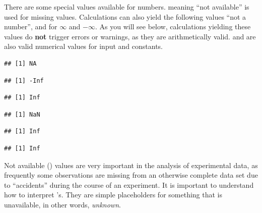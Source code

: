 \documentclass[krantz2]{krantz}\usepackage{knitr}
\begin{document}
There\label{par:special:values} are some special values available for numbers.  meaning ``not available'' is used for missing values. Calculations can also yield the following values  ``not a number'',  and  for $\infty$ and $-\infty$. As you will see below, calculations yielding these values do \textbf{not} trigger errors or warnings, as they are arithmetically valid.  and  are also valid numerical values for input and constants.

\begin{knitrout}\footnotesize
{}\color{fgcolor}\begin{kframe}
\begin{alltt}
 \hlkwb{<-} 
\end{alltt}
\begin{verbatim}
## [1] NA
\end{verbatim}
\begin{alltt}
\hlopt{-} \hlopt{/} 
\end{alltt}
\begin{verbatim}
## [1] -Inf
\end{verbatim}
\begin{alltt}
 \hlopt{/} 
\end{alltt}
\begin{verbatim}
## [1] Inf
\end{verbatim}
\begin{alltt}
 \hlopt{/} 
\end{alltt}
\begin{verbatim}
## [1] NaN
\end{verbatim}
\begin{alltt}
 \hlopt{+} 
\end{alltt}
\begin{verbatim}
## [1] Inf
\end{verbatim}
\begin{alltt}
 \hlkwb{<-} \hlopt{-}
 \hlopt{* -}
\end{alltt}
\begin{verbatim}
## [1] Inf
\end{verbatim}
\end{kframe}
\end{knitrout}

Not available () values are very important in the analysis of experimental data, as frequently some observations are missing from an otherwise complete data set due to ``accidents'' during the course of an experiment. It is important to understand how to interpret 's. They are simple placeholders for something that is unavailable, in other words, \emph{unknown}.
\end{document}
